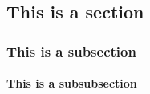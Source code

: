 
\chapter{} 
\lipsum[20]
\section{This is a section}
\lipsum[50]
\subsection{This is a subsection}
\lipsum[50]
\subsubsection{This is a subsubsection}
\lipsum[50]
